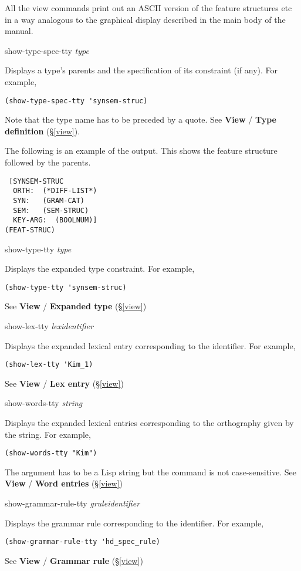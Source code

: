 \documentclass[12pt]{report}
\newcommand{\lispcommand}[1]{\noindent\rm #1}%
\newcommand{\lkbmenucommand}{\bf}
\begin{document}
All the view commands print out an ASCII version of the 
feature structures etc in a way analogous to the
graphical display described in the main body of the manual.

\lispcommand{show-type-spec-tty {\it type}}

Displays a type's parents 
and the specification of its constraint (if any).
For example,
\begin{verbatim}
(show-type-spec-tty 'synsem-struc)
\end{verbatim}
Note that the type name has to be preceded by a quote.
See {\lkbmenucommand View} / {\lkbmenucommand Type definition} (\S\ref{view}).

The following is an example of the output.
This shows the feature structure followed by the
parents.
\begin{verbatim}
 [SYNSEM-STRUC
  ORTH:  (*DIFF-LIST*)
  SYN:   (GRAM-CAT)
  SEM:   (SEM-STRUC)
  KEY-ARG:  (BOOLNUM)]
(FEAT-STRUC)
\end{verbatim}

\lispcommand{show-type-tty {\it type}}

Displays the expanded type constraint.
For example,
\begin{verbatim}
(show-type-tty 'synsem-struc)
\end{verbatim}
See {\lkbmenucommand View} / {\lkbmenucommand Expanded type} (\S\ref{view})

\lispcommand{show-lex-tty {\it lexidentifier}}

Displays the expanded lexical entry corresponding to the identifier.
For example,
\begin{verbatim}
(show-lex-tty 'Kim_1)
\end{verbatim}
See {\lkbmenucommand View} / {\lkbmenucommand Lex entry} (\S\ref{view})

\lispcommand{show-words-tty {\it string}}

Displays the expanded lexical entries corresponding to the 
orthography given by the string.
For example,
\begin{verbatim}
(show-words-tty "Kim")
\end{verbatim}
The argument has to be a Lisp string but the command is
not case-sensitive.
See {\lkbmenucommand View} / {\lkbmenucommand Word entries} (\S\ref{view})

\lispcommand{show-grammar-rule-tty {\it gruleidentifier}}

Displays the grammar rule corresponding to the identifier.
For example,
\begin{verbatim}
(show-grammar-rule-tty 'hd_spec_rule)
\end{verbatim}
See {\lkbmenucommand View} / {\lkbmenucommand Grammar rule} (\S\ref{view})
\end{document}
